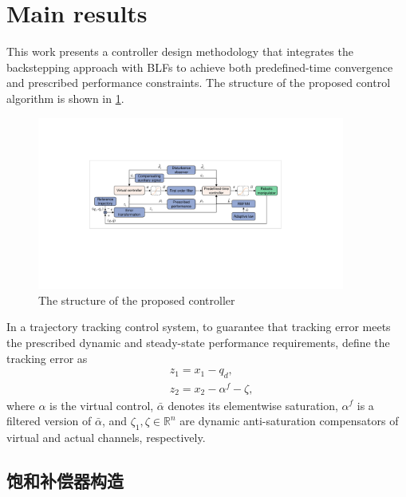 \documentclass[pdflatex,sn-mathphys-num]{sn-jnl}%
\theoremstyle{thmstyleone}%
\theoremstyle{thmstyletwo}%
\theoremstyle{thmstylethree}%
\begin{document}
\section{Main results}


This work presents a controller design methodology that integrates the backstepping approach with BLFs to achieve both predefined-time convergence and prescribed performance constraints. The structure of the proposed control algorithm is shown in \cref{fig:2}.
\begin{figure}[H]
	\centering
	\includegraphics[width=0.9\textwidth]{fig2.pdf}
	\caption{The structure of the proposed controller}
	\label{fig:2}
\end{figure}



\par In a trajectory tracking control system, to  guarantee that tracking error meets the prescribed dynamic and steady-state performance requirements, define the tracking error as
\begin{subequations}\label{eq:20}
	\begin{align}
		&z_{1} = x_{1} - q_{d}, \\
	  &z_{2} = x_{2} -\alpha^{f}-\zeta,
	\end{align}
	\end{subequations}
	where $\alpha$ is the virtual control, $\bar{\alpha}$ denotes its elementwise saturation, $\alpha^{f}$ is a filtered version of $\bar{\alpha}$, and $\zeta_{1},\zeta \in\mathbb{R}^{n}$ are dynamic anti-saturation compensators of virtual and actual channels, respectively.


\subsection{饱和补偿器构造}
\end{document}
